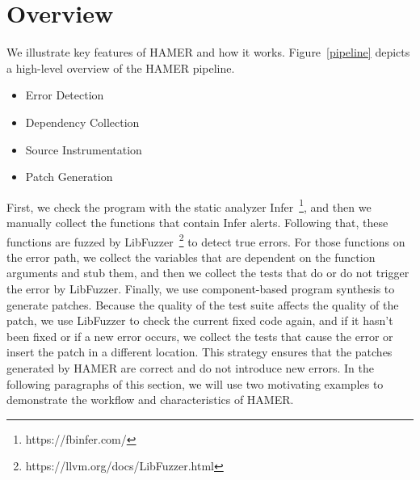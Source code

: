 \documentclass[a4j,dvipdfmx]{article}
\begin{document}
\section{Overview}

We illustrate key features of HAMER and how it works. Figure~\ref{pipeline} depicts a high-level overview of the HAMER pipeline.

\begin{itemize}
\item[\textbf{(1)}] Error Detection
\item[\textbf{(2)}] Dependency Collection
\item[\textbf{(3)}] Source Instrumentation
\item[\textbf{(4)}] Patch Generation
\end{itemize}

First, we check the program with the static analyzer \mbox{Infer}~\footnote{https://fbinfer.com/}, and then we manually collect the functions that contain Infer alerts. Following that, these functions are fuzzed by LibFuzzer~\footnote{https://llvm.org/docs/LibFuzzer.html} to detect true errors.  For those functions on the error path, we collect the variables that are dependent on the function arguments and stub them, and then we collect the tests that do or do not trigger the error by LibFuzzer. Finally, we use component-based program synthesis to generate patches. Because the quality of the test suite affects the quality of the patch, we use LibFuzzer to check the current fixed code again, and if it hasn't been fixed or if a new error occurs, we collect the tests that cause the error or insert the patch in a different location. This strategy ensures that the patches generated by HAMER are correct and do not introduce new errors. In the following paragraphs of this section, we will use two motivating examples to demonstrate the workflow and characteristics of HAMER.
\end{document}
